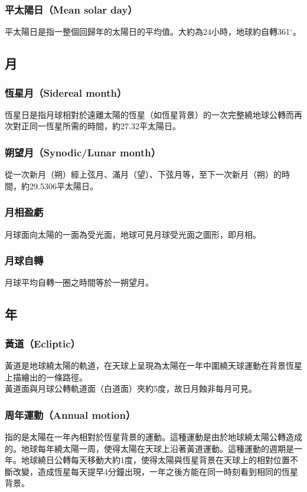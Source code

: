 \documentclass[a4paper,12pt]{report}
\begin{document}
\subsubsection{平太陽日（Mean solar day）}
平太陽日是指一整個回歸年的太陽日的平均值。大約為24小時，地球約自轉361$^\circ$。
\subsection{月}
\subsubsection{恆星月（Sidereal month）}
恆星日是指月球相對於遠離太陽的恆星（如恆星背景）的一次完整繞地球公轉而再次對正同一恆星所需的時間，約27.32平太陽日。
\subsubsection{朔望月（Synodic/Lunar month）}
從一次新月（朔）經上弦月、滿月（望）、下弦月等，至下一次新月（朔）的時間，約29.5306平太陽日。
\subsubsection{月相盈虧}
月球面向太陽的一面為受光面，地球可見月球受光面之圖形，即月相。
\subsubsection{月球自轉}
月球平均自轉一圈之時間等於一朔望月。
\subsection{年}
\subsubsection{黃道（Ecliptic）}
黃道是地球繞太陽的軌道，在天球上呈現為太陽在一年中圍繞天球運動在背景恆星上描繪出的一條路徑。\\
黃道面與月球公轉軌道面（白道面）夾約5度，故日月蝕非每月可見。
\subsubsection{周年運動（Annual motion）}
指的是太陽在一年內相對於恆星背景的運動。這種運動是由於地球繞太陽公轉造成的。地球每年繞太陽一周，使得太陽在天球上沿著黃道運動。這種運動的週期是一年。地球繞日公轉每天移動大約1度，使得太陽與恆星背景在天球上的相對位置不斷改變，造成恆星每天提早4分鐘出現，一年之後方能在同一時刻看到相同的恆星背景。
\end{document}
